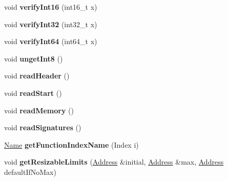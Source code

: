 \begin{DoxyCompactItemize}
void {\bfseries verify\+Int16} (int16\+\_\+t x)
\item 
\mbox{\label{classwasm_1_1_wasm_binary_builder_a4de3d9fe82f8e126e77c2922d58ed730}} 
void {\bfseries verify\+Int32} (int32\+\_\+t x)
\item 
\mbox{\label{classwasm_1_1_wasm_binary_builder_af23e49257a9bd7037c9d981f6679bbdb}} 
void {\bfseries verify\+Int64} (int64\+\_\+t x)
\item 
\mbox{\label{classwasm_1_1_wasm_binary_builder_a12d77879de18da8e2a565f463b7d2517}} 
void {\bfseries unget\+Int8} ()
\item 
\mbox{\label{classwasm_1_1_wasm_binary_builder_a038a6b2ee1ec01a84a0274034e3b955a}} 
void {\bfseries read\+Header} ()
\item 
\mbox{\label{classwasm_1_1_wasm_binary_builder_a318b1da28cd38c25ec0d61a32e98dbf5}} 
void {\bfseries read\+Start} ()
\item 
\mbox{\label{classwasm_1_1_wasm_binary_builder_a15708a8da56afe72cf25c8fb5dab28e1}} 
void {\bfseries read\+Memory} ()
\item 
\mbox{\label{classwasm_1_1_wasm_binary_builder_adfd6c1a828a2e78c4784fbab6b6cbdd9}} 
void {\bfseries read\+Signatures} ()
\item 
\mbox{\label{classwasm_1_1_wasm_binary_builder_a0fccb8ebee8308cb2010eb9184bd45fc}} 
\mbox{\hyperlink{structwasm_1_1_name}{Name}} {\bfseries get\+Function\+Index\+Name} (Index i)
\item 
\mbox{\label{classwasm_1_1_wasm_binary_builder_afff922498086983f16d7ccc8f927ab77}} 
void {\bfseries get\+Resizable\+Limits} (\mbox{\hyperlink{structwasm_1_1_address}{Address}} \&initial, \mbox{\hyperlink{structwasm_1_1_address}{Address}} \&max, \mbox{\hyperlink{structwasm_1_1_address}{Address}} default\+If\+No\+Max)
\item 
\mbox{\label{classwasm_1_1_wasm_binary_builder_a4fae9da5a256decd43b471cb431a3a87}} 

\end{DoxyCompactItemize}
